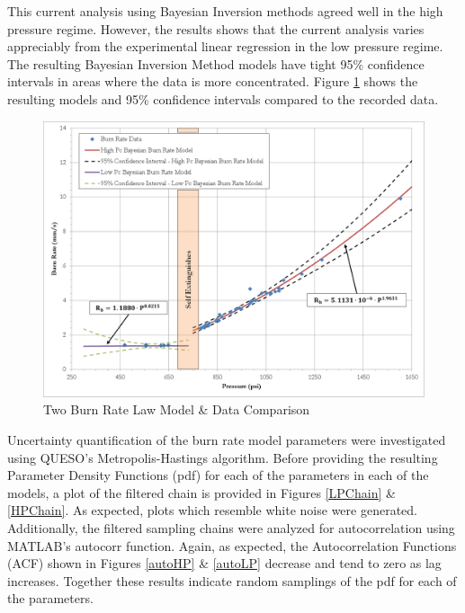 \documentclass{article}
\begin{document}
This current analysis using Bayesian Inversion methods agreed well in the high pressure regime. However, the
results shows that the current analysis varies appreciably from the experimental linear regression in the low
pressure regime. The resulting Bayesian Inversion Method models have tight 95\% confidence intervals in 
areas where the data is more concentrated. Figure \ref{DualBRfig} shows the resulting models and 95\% confidence 
intervals compared to the recorded data.

\begin{figure}[htb]
\centering
\includegraphics[width=\textwidth]{Dual_Burn_Rate_Results.png}
\caption{Two Burn Rate Law Model \& Data Comparison}
\label{DualBRfig}
\end{figure}

Uncertainty quantification of the burn rate model parameters were investigated using QUESO's Metropolis-Hastings
algorithm. Before providing the resulting Parameter Density Functions (pdf) for each of the parameters in each of 
the models, a plot of the filtered chain is provided in Figures \ref{LPChain} \& \ref{HPChain}. As expected, 
plots which resemble white noise were generated. Additionally, the filtered sampling chains were analyzed for
autocorrelation using MATLAB's autocorr function. Again, as expected, the Autocorrelation Functions (ACF) shown in
Figures \ref{autoHP} \& \ref{autoLP} decrease and tend to zero as lag increases. Together these results indicate
random samplings of the pdf for each of the parameters.
\end{document}
